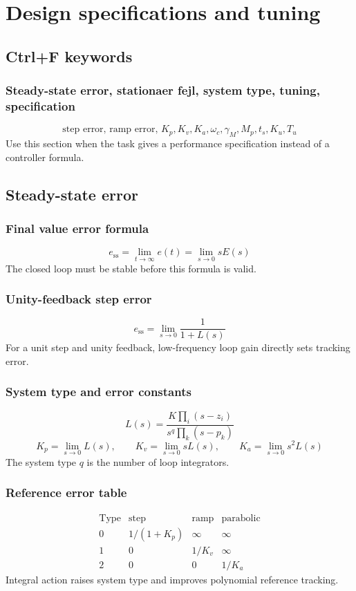 \section{Design specifications and tuning}

\subsection{Ctrl+F keywords}

\subsubsection{Steady-state error, stationaer fejl, system type, tuning, specification}
\[
\text{step error, ramp error, }K_p,K_v,K_a,\omega_c,\gamma_M,M_p,t_s,K_u,T_u
\]
Use this section when the task gives a performance specification instead of a controller formula.

\subsection{Steady-state error}

\subsubsection{Final value error formula}
\[
e_{\mathrm{ss}}=\lim_{t\to\infty}e(t)=\lim_{s\to0}sE(s)
\]
The closed loop must be stable before this formula is valid.

\subsubsection{Unity-feedback step error}
\[
e_{\mathrm{ss}}=\lim_{s\to0}\frac{1}{1+L(s)}
\]
For a unit step and unity feedback, low-frequency loop gain directly sets tracking error.

\subsubsection{System type and error constants}
\[
L(s)=\frac{K\prod_i(s-z_i)}{s^q\prod_k(s-p_k)}
\]
\[
K_p=\lim_{s\to0}L(s),\qquad K_v=\lim_{s\to0}sL(s),\qquad K_a=\lim_{s\to0}s^2L(s)
\]
The system type \(q\) is the number of loop integrators.

\subsubsection{Reference error table}
\[
\begin{array}{c|ccc}
\text{Type} & \text{step} & \text{ramp} & \text{parabolic}\\ \hline
0 & 1/(1+K_p) & \infty & \infty\\
1 & 0 & 1/K_v & \infty\\
2 & 0 & 0 & 1/K_a
\end{array}
\]
Integral action raises system type and improves polynomial reference tracking.

